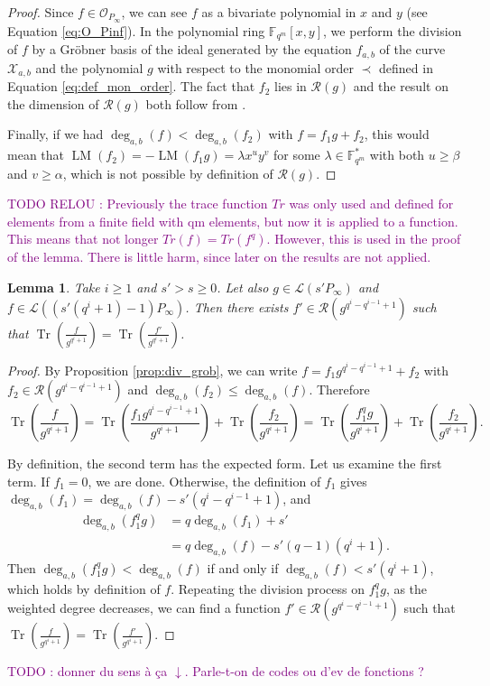 \documentclass[a4paper]{amsart}
\newtheorem{lemma}[thm]{Lemma}
\theoremstyle{definition}
\theoremstyle{remark}
\newcommand{\calL}{\mathcal{L}}
\newcommand{\calO}{\mathcal{O}}
\newcommand{\calR}{\mathcal{R}}
\newcommand{\calX}{\mathcal{X}}
\newcommand{\F}{\mathbb{F}}
\newcommand{\Tr}[1]{\operatorname{Tr}\left(#1\right)}
\newcommand{\LM}[1]{\operatorname{LM}\left(#1\right)}
\newcommand{\degab}[1]{\deg_{a,b}\left(#1\right)}
\newcommand\jade[1]{\textcolor{purple}{#1}}
\begin{document}
\begin{proof}
  Since $f \in \calO_{P_\infty}$, we can see $f$ as a bivariate polynomial in $x$ and $y$ (see Equation \ref{eq:O_Pinf}). In the polynomial ring $\F_{q^m}[x,y]$, we perform the division of $f$ by a Gr\"obner basis of the ideal generated by the equation $f_{a,b}$ of the curve $\calX_{a,b}$ and the polynomial $g$ with respect to the monomial order $\prec$ defined in Equation \eqref{eq:def_mon_order}. The fact that $f_2$ lies in $\calR(g)$ and the result on the dimension of $\calR(g)$ both follow from \cite[Proposition 4]{GH00}.
 
 Finally, if we had $\degab{f} < \degab{f_2}$ with $f=f_1 g +f_2$, this would mean that $\LM{f_2}=-\LM{f_1 g}=\lambda x^uy^v$ for some $\lambda \in \F_{q^m}^*$ with both $u \geq \beta$ and $v \geq \alpha$, which is not possible by definition of $\calR\left(g\right)$.
\end{proof}

\jade{TODO RELOU : Previously the trace function $Tr$ was only used and defined	for elements from a finite field with qm elements, but now it is applied to a function.
	This means that not longer $Tr(f) = Tr(f^q)$. However, this is used in the proof of the lemma. There is little harm, since later on the results are not applied.}

\begin{lemma} \label{lem:weighted_division}
Take $i \geq 1$ and $s'>s \geq 0$. Let also $g \in \calL\left(s'P_\infty\right)$ and $f \in \calL\left(\left(s'(q^i+1)-1\right)P_\infty\right)$. Then there exists $f' \in \calR\left(g^{q^i-q^{i-1}+1}\right)$ such that $\Tr{\frac{f}{g^{q^i+1}}} = \Tr{\frac{f'}{g^{q^i+1}}} $.
\end{lemma}

\begin{proof}
By Proposition \ref{prop:div_grob}, we can write $f=f_1 g^{q^i-q^{i-1}+1} +f_2$ with
 $f_2 \in \calR\left(g^{q^i-q^{i-1}+1}\right)$ and $\degab{f_2} \leq \degab{f}$. Therefore
 \[\Tr{\frac{f}{g^{q^i+1}}}=\Tr{\frac{f_1 g^{q^i-q^{i-1}+1}}{g^{q^i+1}}} +\Tr{\frac{f_2}{g^{q^i+1}}}= \Tr{\frac{f_1^qg}{g^{q^i+1}}} +\Tr{\frac{f_2}{g^{q^i+1}}}. \]
 
 By definition, the second term has the expected form. Let us examine the first term. If $f_1=0$, we are done. Otherwise, the definition of $f_1$ gives
$\degab{f_1} =\degab{f} - s'(q^i-q^{i-1}+1)$, and
 \begin{align*}
 \degab{f_1^qg}  &= q \degab{f_1} + s'\\
     &= q\degab{f} - s'(q-1)(q^i+1).
 \end{align*} 
Then  $\degab{f_1^qg} < \degab{f}$ if and only if $\degab{f} < s'(q^i+1)$, which holds by definition of $f$. Repeating the division process on $f_1^qg$, as the weighted degree decreases, we can find a function $f' \in \calR\left(g^{q^i-q^{i-1}+1}\right)$ such that $\Tr{\frac{f}{g^{q^i+1}}} = \Tr{\frac{f'}{g^{q^i+1}}} $.
\end{proof}
\jade{TODO : donner du sens à ça $\downarrow$. Parle-t-on de codes ou d'ev de fonctions ?}
\end{document}
